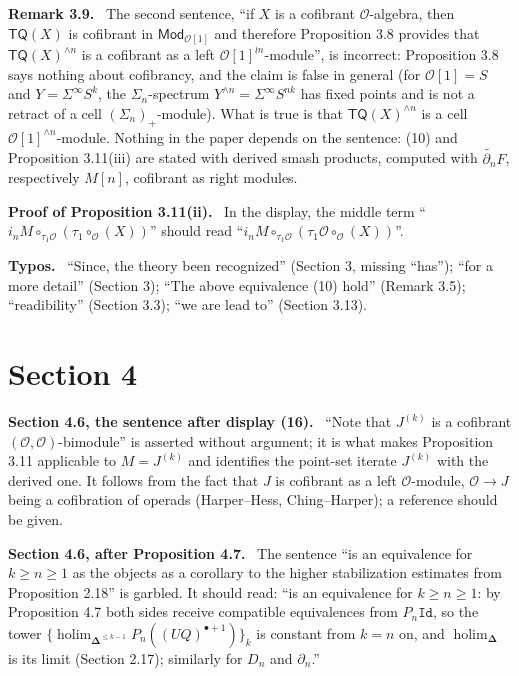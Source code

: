 \documentclass[12pt]{article}
\theoremstyle{plain}
\theoremstyle{definition}
\theoremstyle{remark}
\newcommand{\Cal}[1]{\mathcal{#1}}
\newcommand{\Id}{\mathtt{Id}}
\newcommand{\TQ}{\mathsf{TQ}}
\newcommand{\holim}{\operatorname{holim}}
\newcommand{\bdel}{\mathbf{\Delta}}
\newcommand{\corr}[1]{\par\smallskip\noindent\textbf{#1.}\ }
\begin{document}
\corr{Remark 3.9} The second sentence, ``if $X$ is a cofibrant $\Cal O$-algebra, then $\TQ(X)$ is cofibrant in $\mathsf{Mod}_{\Cal O[1]}$ and therefore Proposition 3.8 provides that $\TQ(X)^{\wedge n}$ is a cofibrant as a left $\Cal O[1]^{\wr n}$-module'', is incorrect: Proposition 3.8 says nothing about cofibrancy, and the claim is false in general (for $\Cal O[1]=S$ and $Y=\Sigma^\infty S^k$, the $\Sigma_n$-spectrum $Y^{\wedge n}=\Sigma^\infty S^{nk}$ has fixed points and is not a retract of a cell $(\Sigma_n)_+$-module). What is true is that $\TQ(X)^{\wedge n}$ is a cell $\Cal O[1]^{\wedge n}$-module. Nothing in the paper depends on the sentence: (10) and Proposition 3.11(iii) are stated with derived smash products, computed with $\widetilde{\partial_n}F$, respectively $M[n]$, cofibrant as right modules.

\corr{Proof of Proposition 3.11(ii)} In the display, the middle term ``$i_nM\circ_{\tau_1\Cal O}(\tau_1\circ_{\Cal O}(X))$'' should read ``$i_nM\circ_{\tau_1\Cal O}(\tau_1\Cal O\circ_{\Cal O}(X))$''.

\corr{Typos} ``Since, the theory been recognized'' (Section 3, missing ``has''); ``for a more detail'' (Section 3); ``The above equivalence (10) hold'' (Remark 3.5); ``readibility'' (Section 3.3); ``we are lead to'' (Section 3.13).

\section*{Section 4}
\label{sec:s4}

\corr{Section 4.6, the sentence after display (16)} ``Note that $J^{(k)}$ is a cofibrant $(\Cal O,\Cal O)$-bimodule'' is asserted without argument; it is what makes Proposition 3.11 applicable to $M=J^{(k)}$ and identifies the point-set iterate $J^{(k)}$ with the derived one. It follows from the fact that $J$ is cofibrant as a left $\Cal O$-module, $\Cal O\to J$ being a cofibration of operads (Harper--Hess, Ching--Harper); a reference should be given.

\corr{Section 4.6, after Proposition 4.7} The sentence ``is an equivalence for $k\geq n\geq1$ as the objects as a corollary to the higher stabilization estimates from Proposition 2.18'' is garbled. It should read: ``is an equivalence for $k\geq n\geq1$: by Proposition 4.7 both sides receive compatible equivalences from $P_n\Id$, so the tower $\{\holim_{\bdel^{\leq k-1}}P_n((UQ)^{\bullet+1})\}_k$ is constant from $k=n$ on, and $\holim_{\bdel}$ is its limit (Section 2.17); similarly for $D_n$ and $\partial_n$.''
\end{document}
